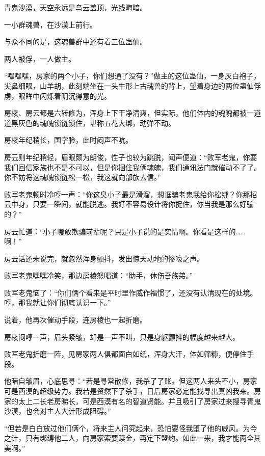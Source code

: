 
\begin{this_body}



青鬼沙漠，天空永远是乌云盖顶，光线晦暗。

一小群魂兽，在沙漠上前行。

与众不同的是，这魂兽群中还有着三位蛊仙。

两人被俘，一人做主。

“嘿嘿嘿，房家的两个小子，你们想通了没有？”做主的这位蛊仙，一身灰白袍子，尖鼻细眼，山羊胡，此刻端坐在一头牛形上古魂兽的背上，望着身边的两位蛊仙俘虏，眼眸中闪烁着阴沉得意的光。

房棱、房云都是六转修为，浑身上下干净清爽，但实际，他们体内的魂魄都被一道道黑灰色的魂魄锁链锁住，堪称五花大绑，动弹不动。

房棱年纪稍长，国字脸，此时闷声不吭。

房云则年纪稍轻，眉眼颇为朗俊，性子也较为跳脱，闻声便道：“败军老鬼，你要我们回信家族也不是不可以，但是你捆住我俩魂魄，我们通讯法门就催动不了了。你不妨将这魂魄锁链松一松，我这就向部族去信。”

败军老鬼顿时冷哼一声：“你这臭小子最是滑溜，想诓骗老鬼我给你松绑？你那招云中身，只要一瞬间，就能脱逃。我好不容易设计将你捉住，你当我是那么好骗的？”

房云忙道：“小子哪敢欺骗前辈呢？只是小子说的是实情啊。你看是这样的……啊！”

房云话还未说完，就忽然浑身颤抖，发出惊天动地的惨嚎之声。

败军老鬼嘿嘿冷笑，那边房棱怒喝道：“助手，休伤吾族弟。”

败军老鬼恼了：“你们俩个看来是平时里作威作福惯了，还没有认清现在的处境。哼，那我就让你们彻底认识一下。”

说着，他再次催动手段，连房棱也一起折磨。

房棱闷哼一声，眉头紧皱，却是一声不叫，只是身躯颤抖的幅度越来越大。

败军老鬼折磨一阵，见房家两人俱都面白如纸，浑身大汗，体如筛糠，便停住手段。

他暗自皱眉，心底思寻：“若是寻常散修，我杀了了账。但这两人来头不小，房家可是西漠的超级势力。我若是贸然下了杀手，日后房家必定能找寻出真凶我来。房家的太上二长老房睇长，可是西漠有名的智道贤能。并且吸引了房家过来搜寻青鬼沙漠，也会对主人大计形成阻碍。”

“但若是白白放过他们俩个，将来主人问究起来，恐怕要怪我堕了他的威风。为今之计，只有绑缚他二人，向房家索要赎金，再定下盟约。如此一来，我才能两全其美啊。”


\end{this_body}
